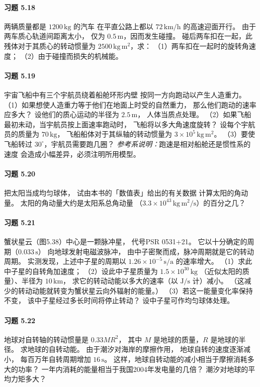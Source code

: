 \paragraph{习题 5.18}
两辆质量都是 \(1200\,\mathrm{kg}\) 的汽车
在平直公路上都以 \(72\,\mathrm{km/h}\)
的高速迎面开行。
由于两车质心轨道间距离太小，
仅为 \(0.5\,\mathrm m\)，因而发生碰撞。
碰后两车扣在一起，此残体对于其质心的转动惯量为
\(2500\,\mathrm{kg\,m^2}\)，求：
（1）两车扣在一起时的旋转角速度；
（2）由于碰撞而损失的机械能。

\paragraph{习题 5.19}
宇宙飞船中有三个宇航员绕着船舱环形内壁
按同一方向跑动以产生人造重力。
（1）如果想使人造重力等于他们在地面上时受的自然重力，
那么他们跑动的速率应多大？
设他们的质心运动的半径为 \(2.5\,\mathrm m\)，
人体当质点处理。
（2）如果飞船最初未动，当宇航员按上面速率跑动时，
飞船将以多大角速度旋转？
设每个宇航员的质量为 \(70\,\mathrm{kg}\)，
飞船船体对于其纵轴的转动惯量为
\(3\times10^5\,\mathrm{kg\,m^2}\)。
（3）要使飞船转过 \(30^\circ\)，宇航员需要跑几圈？
\textit{参考系说明：}跑速是相对船舱还是惯性系的速度
会造成小幅差异，必须注明所用模型。

\paragraph{习题 5.20}
把太阳当成均匀球体，
试由本书的「数值表」给出的有关数据
计算太阳的角动量。
太阳的角动量大约是太阳系总角动量
（\(3.3\times10^{43}\,\mathrm{kg\,m^2/s}\)）的百分之几？

\paragraph{习题 5.21}
蟹状星云（图5.38）中心是一颗脉冲星，
代号PSR 0531+21。
它以十分确定的周期（\(0.033\,\mathrm s\)）
向地球发射电磁波脉冲，
由中子密聚而成，脉冲周期就是它的转动周期。
实测发现，上述中子星的周期以
\(1.26\times10^{-5}\,\mathrm{s/a}\) 的速率增大。
（1）求此中子星的自转角加速度；
（2）设此中子星质量为 \(1.5\times10^{30}\,\mathrm{kg}\)
（近似太阳的质量）、半径为 \(10\,\mathrm{km}\)，
求它的转动动能以多大的速率（以 \(\mathrm{J/s}\) 计）减小。
（这减少的转动动能就转变为蟹状星云向外辐射的能量。）
（3）若这一能量变化率保持不变，
该中子星经过多长时间将停止转动？
设中子星可作均匀球体处理。

\paragraph{习题 5.22}
地球对自转轴的转动惯量是 \(0.33MR^2\)，
其中 \(M\) 是地球的质量，\(R\) 是地球的半径。
求地球的自转动能。
由于潮汐对海岸的摩擦作用，
地球自转的速度逐渐减小，
每百万年自转周期增加 \(16\,\mathrm s\)。
这样，地球自转动能的减小相当于摩擦消耗多大的功率？
一年内消耗的能量相当于我国2004年发电量的几倍？
潮汐对地球的平均力矩多大？

